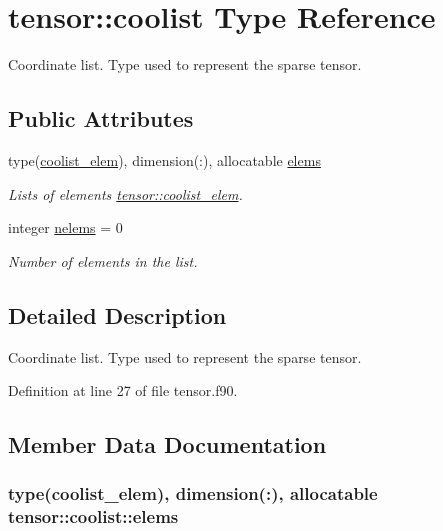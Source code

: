 \hypertarget{structtensor_1_1coolist}{}\section{tensor\+:\+:coolist Type Reference}
\label{structtensor_1_1coolist}


Coordinate list. Type used to represent the sparse tensor.  


\subsection*{Public Attributes}
\begin{DoxyCompactItemize}
\item 
type(\hyperlink{structtensor_1_1coolist__elem}{coolist\+\_\+elem}), dimension(\+:), allocatable \hyperlink{structtensor_1_1coolist_a49ece7bfa6e6e37b4223a1c63b5c7839}{elems}
\begin{DoxyCompactList}\small\item\em Lists of elements \hyperlink{structtensor_1_1coolist__elem}{tensor\+::coolist\+\_\+elem}. \end{DoxyCompactList}\item 
integer \hyperlink{structtensor_1_1coolist_aac72e7727f1b161da2b9d54e25eb7aae}{nelems} = 0
\begin{DoxyCompactList}\small\item\em Number of elements in the list. \end{DoxyCompactList}\end{DoxyCompactItemize}


\subsection{Detailed Description}
Coordinate list. Type used to represent the sparse tensor. 

Definition at line 27 of file tensor.\+f90.



\subsection{Member Data Documentation}
\subsubsection[{\texorpdfstring{elems}{elems}}]{\setlength{\rightskip}{0pt plus 5cm}type({\bf coolist\+\_\+elem}), dimension(\+:), allocatable tensor\+::coolist\+::elems}\hypertarget{structtensor_1_1coolist_a49ece7bfa6e6e37b4223a1c63b5c7839}{}\label{structtensor_1_1coolist_a49ece7bfa6e6e37b4223a1c63b5c7839}


